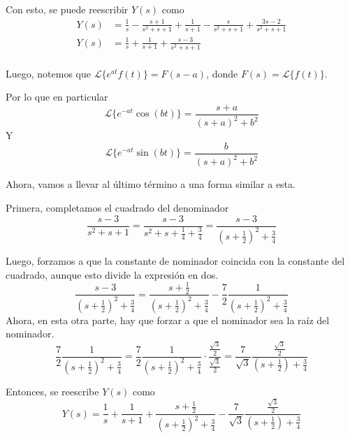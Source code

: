 \documentclass{article}
\begin{document}
\begin{enumerate}
{        	Con esto, se puede reescribir $Y(s)$ como 
        	\begin{align*}
        	Y(s) &= \frac{1}{s} - \frac{s+1}{s^2+s+1} + \frac{1}{s+1} 
        	- \frac{s}{s^2+s+1} + \frac{3s-2}{s^2+s+1} \\
        	Y(s) &= \frac{1}{s} + \frac{1}{s+1} + \frac{s-3}{s^2+s+1} \\
        	\end{align*}
        	
        	Luego, notemos que $\mathcal{L}\{e^{at}f(t)\} = F(s-a)$, 
        	donde $F(s) = \mathcal{L}\{f(t)\}$.
        	
        	Por lo que en particular
        	\[\mathcal{L}\{e^{-at}\cos(bt)\} = \frac{s+a}{(s+a)^2+b^2}\]
        	Y 
        	\[\mathcal{L}\{e^{-at}\sin(bt)\} = \frac{b}{(s+a)^2+b^2}\]
        	
        	
        	Ahora, vamos a llevar al último término a una forma similar a esta.
        	
        	Primera, completamos el cuadrado del denominador
        	\[
        	\frac{s-3}{s^2+s+1} 
        	= \frac{s-3}{s^2+s+\frac{1}{4} + \frac{3}{4}}
        	= \frac{s-3}{(s+\frac{1}{2})^2+\frac{3}{4}}
        	\]
        	
        	Luego, forzamos a que la constante de nominador coincida con la
        	constante del cuadrado, aunque esto divide la expresión en dos.
        	\[
        	\frac{s-3}{(s+\frac{1}{2})^2+\frac{3}{4}} 
        	= \frac{s+\frac{1}{2}}{(s+\frac{1}{2})^2+\frac{3}{4}}
        	- \frac{7}{2}\frac{1}{(s+\frac{1}{2})^2+\frac{3}{4}}
        	\]
        	Ahora, en esta otra parte, hay que forzar a que el nominador sea la
        	raíz del nominador.
        	\[
        	\frac{7}{2}\frac{1}{(s+\frac{1}{2})^2+\frac{3}{4}} 
        	= \frac{7}{2} \frac{1}{(s+\frac{1}{2})^2+\frac{3}{4}}
        	\cdot \frac{\frac{\sqrt{3}}{2}}{\frac{\sqrt{3}}{2}}
        	= \frac{7}{\sqrt{3}}\frac{\frac{\sqrt{3}}{2}}{(s+\frac{1}{2})
        		+\frac{3}{4}}
        	\]
        	
        	Entonces, se reescribe $Y(s)$ como 
        	\[
        	Y(s) = \frac{1}{s} + \frac{1}{s+1}
        	+ \frac{s+\frac{1}{2}}{(s+\frac{1}{2})^2+\frac{3}{4}}
        	-\frac{7}{\sqrt{3}}\frac{\frac{\sqrt{3}}{2}}{(s+\frac{1}{2})+\frac{3}{4}}
        	\]
        	
}
\end{enumerate}
\end{document}
